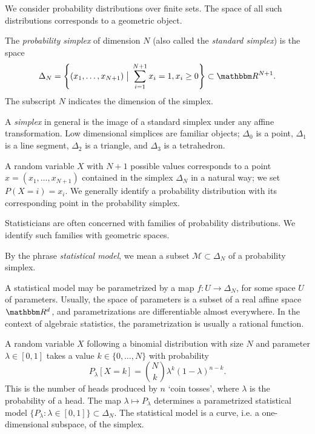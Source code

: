 \documentclass[11pt,titlepage]{article}
\newcommand*{\Mod}{\mathcal{M}}
\newcommand*{\vbar}{\;\big\vert\;}
\numberwithin{equation}{section}
\begin{document}
    We consider probability distributions over finite sets.  The space of all
    such distributions corresponds to a geometric object.
    
    \begin{definition} The \emph{probability simplex} of dimension $N$ (also
    called the \emph{standard simplex}) is the space
    \[
        \Delta_N = 
        \left\{(x_1, \ldots, x_{N+1}) \vbar \sum_{i=1}^{N+1} x_i= 1, x_i \ge 0 \right\} 
        \subset
        \R^{N+1}.
    \]
    The subscript $N$ indicates the dimension of the simplex.
    \end{definition}
    A \emph{simplex} in general is the image of a standard simplex under any
    affine transformation.  Low dimensional simplices are familiar objects;
    $\Delta_0$ is a point, $\Delta_1$ is a line segment, $\Delta_2$ is a
    triangle, and $\Delta_3$ is a tetrahedron.
    \begin{center}
    \end{center}
    A random variable $X$ with $N+1$ possible values corresponds to a point $x =
    (x_1, \ldots, x_{N+1})$ contained in the simplex $\Delta_N$ in a natural
    way; we set $P(X = i) = x_i$.  We generally identify a probability
    distribution with its corresponding point in the probability simplex.
    
    Statisticians are often concerned with families of probability
    distributions.  We identify such families with geometric spaces.
    \begin{definition}
    By the phrase \emph{statistical model}, we mean a subset $\Mod \subset
    \Delta_N$ of a probability simplex.
    \end{definition}
    \noindent A statistical model may be parametrized by a map $f: U \to
    \Delta_N$, for some space $U$ of parameters.  Usually, the space of
    parameters is a subset of a real affine space $\R^d$, and parametrizations
    are differentiable almost everywhere.  In the context of algebraic
    statistics, the parametrization is usually a rational function.
    \begin{example}
    A random variable $X$ following a binomial distribution with size $N$ and
    parameter $\lambda \in [0,1]$ takes a value $k \in \{0,\ldots, N\}$ with
    probability
    \[
        P_\lambda[X = k] = {N \choose k} \lambda^k(1-\lambda)^{n-k}.
    \]
    This is the number of heads produced by $n$ `coin tosses', where $\lambda$
    is the probability of a head.  The map $\lambda \mapsto P_\lambda$
    determines a parametrized statistical model $\{P_\lambda : \lambda \in [0,1]
    \} \subset \Delta_N$. The statistical model is a curve, i.e. a
    one-dimensional subspace, of the simplex.
    \end{example}
    
\end{document}
